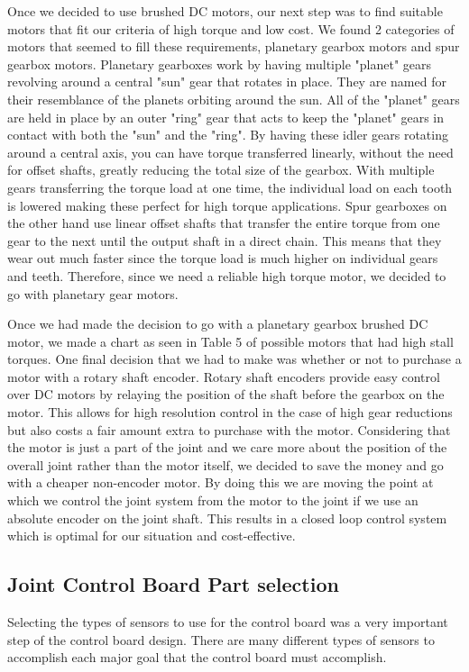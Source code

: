 \noindent Once we decided to use brushed DC motors, our next step was to find suitable motors that fit our criteria of high torque and low cost. We found 2 categories of motors that seemed to fill these requirements, planetary gearbox motors and spur gearbox motors. Planetary gearboxes work by having multiple "planet" gears revolving around a central "sun" gear that rotates in place. They are named for their resemblance of the planets orbiting around the sun. All of the "planet" gears are held in place by an outer "ring" gear that acts to keep the "planet" gears in contact with both the "sun" and the "ring". By having these idler gears rotating around a central axis, you can have torque transferred linearly, without the need for offset shafts, greatly reducing the total size of the gearbox. With multiple gears transferring the torque load at one time, the individual load on each tooth is lowered making these perfect for high torque applications. Spur gearboxes on the other hand use linear offset shafts that transfer the entire torque from one gear to the next until the output shaft in a direct chain.  This means that they wear out much faster since the torque load is much higher on individual gears and teeth.  Therefore, since we need a reliable high torque motor, we decided to go with planetary gear motors. 

\noindent Once we had made the decision to go with a planetary gearbox brushed DC motor, we made a chart as seen in Table 5 of possible motors that had high stall torques.  One final decision that we had to make was whether or not to purchase a motor with a rotary shaft encoder. Rotary shaft encoders provide easy control over DC motors by relaying the position of the shaft before the gearbox on the motor.  This allows for high resolution control in the case of high gear reductions but also costs a fair amount extra to purchase with the motor.  Considering that the motor is just a part of the joint and we care more about the position of the overall joint rather than the motor itself, we decided to save the money and go with a cheaper non-encoder motor.  By doing this we are moving the point at which we control the joint system from the motor to the joint if we use an absolute encoder on the joint shaft.  This results in a closed loop control system which is optimal for our situation and cost-effective.  

\subsection{Joint Control Board Part selection}
Selecting the types of sensors to use for the control board was a very important step of the control board design. There are many different types of sensors to accomplish each major goal that the control board must accomplish.

